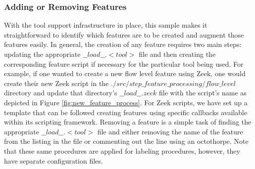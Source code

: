 \documentclass[conference]{IEEEtran}
\begin{document}
\subsubsection{Adding or Removing Features}\label{subsubsec:adding_removing_features}
With the tool support infrastructure in place, this sample makes it straightforward to identify which features are to be created and augment those features easily.
In general, the creation of any feature requires two main steps:  updating the appropriate $\_\_load\_\_.<tool>$ file and then creating the corresponding feature script if necessary for the particular tool being used.
For example, if one wanted to create a new flow level feature using Zeek, one would create their new Zeek script in the $./src/step\_feature\_processing/flow\_level$ directory and update that directory's $\_\_load\_\_.zeek$ file with the script's name as depicted in Figure \ref{fig:new_feature_process}.
For Zeek scripts, we have set up a template that can be followed creating features using specific callbacks available within its scripting framework.
Removing a feature is a simple task of finding the appropriate $\_\_load\_\_.<tool>$ file and either removing the name of the feature from the listing in the file or commenting out the line using an octothorpe.
Note that these same procedures are applied for labeling procedures, however, they have separate configuration files.
\end{document}
